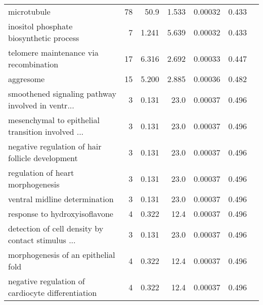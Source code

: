 \begin{longtable}{|l|r|r|r|r|r|}
                                       microtubule &                      78 &                    50.9 &      1.533 &              0.00032 &                        0.433~~ \\
           inositol phosphate biosynthetic process &                       7 &                   1.241 &      5.639 &              0.00032 &                        0.433~~ \\
            telomere maintenance via recombination &                      17 &                   6.316 &      2.692 &              0.00033 &                        0.447~~ \\
                                         aggresome &                      15 &                   5.200 &      2.885 &              0.00036 &                        0.482~~ \\
 smoothened signaling pathway involved in ventr... &                       3 &                   0.131 &       23.0 &              0.00037 &                        0.496~~ \\
 mesenchymal to epithelial transition involved ... &                       3 &                   0.131 &       23.0 &              0.00037 &                        0.496~~ \\
  negative regulation of hair follicle development &                       3 &                   0.131 &       23.0 &              0.00037 &                        0.496~~ \\
                 regulation of heart morphogenesis &                       3 &                   0.131 &       23.0 &              0.00037 &                        0.496~~ \\
                     ventral midline determination &                       3 &                   0.131 &       23.0 &              0.00037 &                        0.496~~ \\
                     response to hydroxyisoflavone &                       4 &                   0.322 &       12.4 &              0.00037 &                        0.496~~ \\
 detection of cell density by contact stimulus ... &                       3 &                   0.131 &       23.0 &              0.00037 &                        0.496~~ \\
               morphogenesis of an epithelial fold &                       4 &                   0.322 &       12.4 &              0.00037 &                        0.496~~ \\
 negative regulation of cardiocyte differentiation &                       4 &                   0.322 &       12.4 &              0.00037 &                        0.496~~ \\

\end{longtable}
